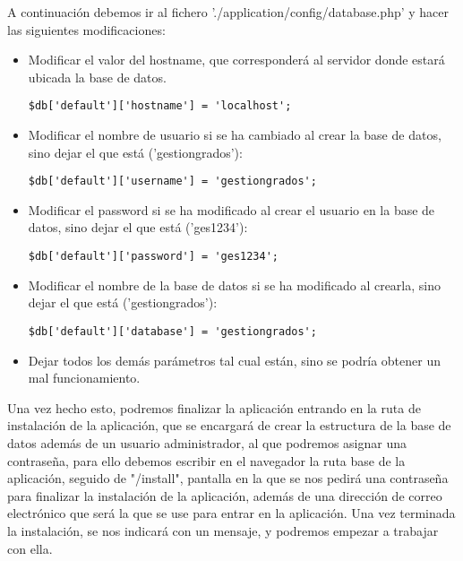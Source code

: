 A continuación debemos ir al fichero './application/config/database.php' y hacer las siguientes modificaciones:
\begin{itemize}
\item Modificar el valor del hostname, que corresponderá al servidor donde estará ubicada la base de datos.
\begin{lstlisting}[style=PHP]
	$db['default']['hostname'] = 'localhost';
\end{lstlisting}
\item Modificar el nombre de usuario si se ha cambiado al crear la base de datos, sino dejar el que está ('gestiongrados'):
\begin{lstlisting}[style=PHP]
	$db['default']['username'] = 'gestiongrados';
\end{lstlisting}
\item Modificar el password si se ha modificado al crear el usuario en la base de datos, sino dejar el que está ('ges1234'):
\begin{lstlisting}[style=PHP]
	$db['default']['password'] = 'ges1234';
\end{lstlisting}
\item Modificar el nombre de la base de datos si se ha modificado al crearla, sino dejar el que está ('gestiongrados'):
\begin{lstlisting}[style=PHP]
	$db['default']['database'] = 'gestiongrados';
\end{lstlisting}
\item Dejar todos los demás parámetros tal cual están, sino se podría obtener un mal funcionamiento.
\end{itemize}

Una vez hecho esto, podremos finalizar la aplicación entrando en la ruta de instalación de la aplicación, que se encargará de crear la estructura de la base de datos además de un usuario administrador, al que podremos asignar una contraseña, para ello debemos escribir en el navegador la ruta base de la aplicación, seguido de "/install", pantalla en la que se nos pedirá una contraseña para finalizar la instalación de la aplicación, además de una dirección de correo electrónico que será la que se use para entrar en la aplicación. Una vez terminada la instalación, se nos indicará con un mensaje, y podremos empezar a trabajar con ella.

